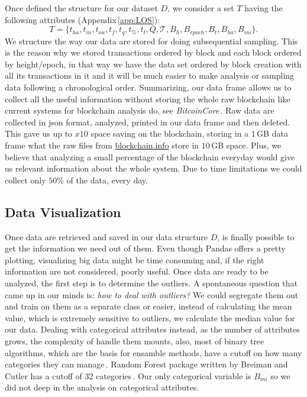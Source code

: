 \documentclass[USenglish]{uit-thesis}
\begin{document}
Once defined the structure for our dataset $D$,
we consider a set $T$ having the following
attributes (Appendix\,\ref{app:LOS}):
\[
T = \{ t_{ha}, t_{in}, t_{ou}, t_f, t_q, t_\%, t_l, Q, \mathcal{T}, B_h, B_{epoch}, B_t, B_{ha}, B_{mi} \}.
\]
We structure the way our data are stored for doing
subsequential sampling.
This is the reason why we stored transactions
ordered by block and each block ordered by height/epoch,
in that way we have the data set ordered by block creation
with all its transactions in it and it will be much easier to make
analysis or sampling data following a chronological order.
Summarizing, our data frame allows us to collect all
the useful information without storing the whole raw
blockchain like current systems for blockchain analysis do,
see \emph{BitcoinCore}\,\cite{bitcoincore}. Raw data are
collected in \gls{json} format, analyzed, printed in our data frame
and then deleted. This gave us up to $x10$ space saving on the
blockchain, storing in a $1$\,GB data frame what the raw files
from \url{blockchain.info} store in $10$\,GB space. Plus, we
believe that analyzing a small percentage of the blockchain
everyday would give us relevant information about the
whole system. Due to time limitations we could collect only $50$\%
of the data, every day.

\subsection{Data Visualization}
\label{sec:datavisualization}
Once data are retrieved and saved in our data structure $D$,
is finally possible to get the information we need out of them.
Even though Pandas offers a pretty plotting, 
visualizing big data might be time consuming
and, if the right information are not considered, poorly useful.
Once data are ready to be analyzed, the first
step is to determine the outliers.
A spontaneous question that came up in our minds is:
\emph{how to deal with outliers?} We could segregate them
out and train on them as a separate class or easier, instead of
calculating the mean value, which is extremely sensitive to outliers,
we calculate the median value for our data.
Dealing with categorical attributes instead, as the number
of attributes grows,
the complexity of handle them mounts,
also, most of binary tree algorithms, which are the basis for
ensamble methods, have a cutoff on how many
categories they can manage\,\cite{bowles2015machine}.
Random Forest package written by Breiman and Cutler
has a cutoff of 32 categories\,\cite{Breiman:2001:RF}.
Our only categorical variable is $B_{mi}$ so we
did not deep in the analysis on categorical attributes.
\end{document}

